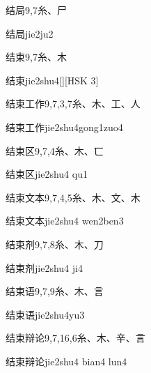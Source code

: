 \begin{entry}{结局}{9,7}{⽷、⼫}
  \begin{phonetics}{结局}{jie2ju2}
  \end{phonetics}
\end{entry}

\begin{entry}{结束}{9,7}{⽷、⽊}
  \begin{phonetics}{结束}{jie2shu4}[][HSK 3]
  \end{phonetics}
\end{entry}

\begin{entry}{结束工作}{9,7,3,7}{⽷、⽊、⼯、⼈}
  \begin{phonetics}{结束工作}{jie2shu4gong1zuo4}
  \end{phonetics}
\end{entry}

\begin{entry}{结束区}{9,7,4}{⽷、⽊、⼖}
  \begin{phonetics}{结束区}{jie2shu4 qu1}
  \end{phonetics}
\end{entry}

\begin{entry}{结束文本}{9,7,4,5}{⽷、⽊、⽂、⽊}
  \begin{phonetics}{结束文本}{jie2shu4 wen2ben3}
  \end{phonetics}
\end{entry}

\begin{entry}{结束剂}{9,7,8}{⽷、⽊、⼑}
  \begin{phonetics}{结束剂}{jie2shu4 ji4}
  \end{phonetics}
\end{entry}

\begin{entry}{结束语}{9,7,9}{⽷、⽊、⾔}
  \begin{phonetics}{结束语}{jie2shu4yu3}
  \end{phonetics}
\end{entry}

\begin{entry}{结束辩论}{9,7,16,6}{⽷、⽊、⾟、⾔}
  \begin{phonetics}{结束辩论}{jie2shu4 bian4 lun4}
  \end{phonetics}
\end{entry}

